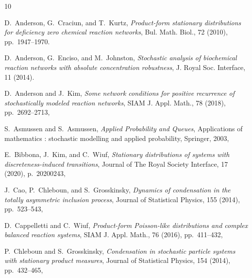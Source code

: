 \documentclass{amsart}
\theoremstyle{definition}
\theoremstyle{remark}
\theoremstyle{Conjecture/open problem}
\theoremstyle{assumption}
\theoremstyle{conjecture}
\numberwithin{equation}{section}
\begin{document}
\begin{thebibliography}{10}

{\sc D.~Anderson, G.~Craciun, and T.~Kurtz}, {\em {Product-form stationary
  distributions for deficiency zero chemical reaction networks}}, Bul. Math.
  Biol., 72 (2010), pp.~1947--1970.

{\sc D.~Anderson, G.~Enciso, and M.~Johnston}, {\em {Stochastic analysis of
  biochemical reaction networks with absolute concentration robustness}}, J.
  Royal Soc. Interface, 11 (2014).

{\sc D.~Anderson and J.~Kim}, {\em Some network conditions for positive
  recurrence of stochastically modeled reaction networks}, SIAM J. Appl. Math.,
  78 (2018), pp.~2692--2713, %

{\sc S.~Asmussen and S.~Asmussen}, {\em Applied Probability and Queues},
  Applications of mathematics : stochastic modelling and applied probability,
  Springer, 2003, %

{\sc E.~Bibbona, J.~Kim, and C.~Wiuf}, {\em Stationary distributions of systems
  with discreteness-induced transitions}, Journal of The Royal Society
  Interface, 17 (2020), p.~20200243,

{\sc J.~Cao, P.~Chleboun, and S.~Grosskinsky}, {\em Dynamics of condensation in
  the totally asymmetric inclusion process}, Journal of Statistical Physics,
  155 (2014), pp.~523--543, %

{\sc D.~Cappelletti and C.~Wiuf}, {\em Product-form {P}oisson-like
  distributions and complex balanced reaction systems}, SIAM J. Appl. Math., 76
  (2016), pp.~411--432, %

{\sc P.~Chleboun and S.~Grosskinsky}, {\em Condensation in stochastic particle
  systems with stationary product measures}, Journal of Statistical Physics,
  154 (2014), pp.~432--465, %


\end{thebibliography}
\end{document}
